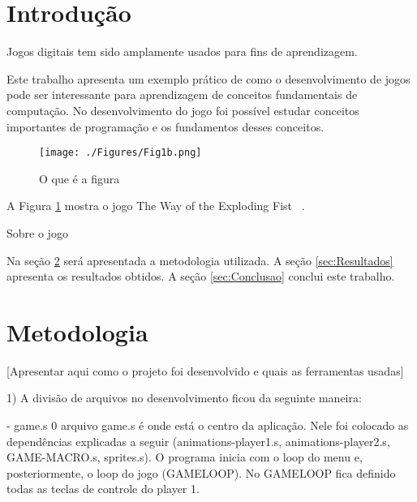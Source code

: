 \documentclass[a4paper]{sbgames}
\begin{document}


\section{Introdução}
\label{sec:introducao}

Jogos digitais tem sido amplamente usados para fins de aprendizagem.

Este trabalho apresenta um exemplo prático de como o desenvolvimento de jogos pode ser interessante para aprendizagem de conceitos fundamentais de computação. No desenvolvimento do jogo foi possível estudar conceitos importantes de programação e os fundamentos desses conceitos. 


\begin{figure}[htb]
  \begin{center}
   \texttt{[image: ./Figures/Fig1b.png]}
  \end{center}
  \caption{O que é a figura}
  \label{fig:01}
\end{figure}

A Figura \ref{fig:01} mostra o jogo The Way of the Exploding Fist  ~\cite{Alt}.

Sobre o jogo

Na seção \ref{sec:Metodologia} será apresentada a metodologia utilizada. A seção \ref{sec:Resultados} apresenta os resultados obtidos. A seção \ref{sec:Conclusao} conclui este trabalho.

\section{Metodologia}
\label{sec:Metodologia}

[Apresentar aqui como o projeto foi desenvolvido e quais as ferramentas usadas] 

1) A divisão de arquivos no desenvolvimento ficou da seguinte maneira:

- game.s
	0 arquivo game.s é onde está o centro da aplicação. Nele foi colocado as dependências explicadas a seguir (animations-player1.s, animations-player2.s, GAME-MACRO.s, sprites.s). O programa inicia com o loop do menu e, posteriormente, o loop do jogo (GAMELOOP). No GAMELOOP fica definido todas as teclas de controle do player 1.
	
\end{document}
